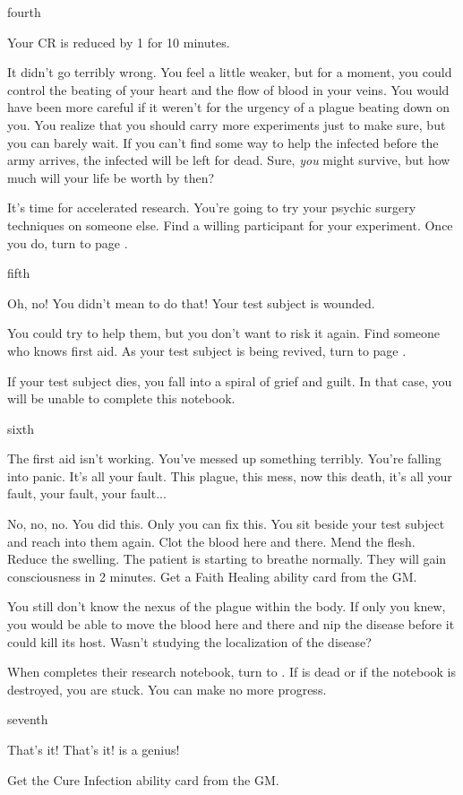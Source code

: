 \documentclass[greennotebook]{guildcamp4} %
\begin{document}
\begin{page}{fourth}

Your CR is reduced by 1 for 10 minutes.

It didn't go terribly wrong. You feel a little weaker, but for a moment, you could control the beating of your heart and the flow of blood in your veins. You would have been more careful if it weren't for the urgency of a plague beating down on you. You realize that you should carry more experiments just to make sure, but you can barely wait. If you can't find some way to help the infected before the army arrives, the infected will be left for dead. Sure, \textit{you} might survive, but how much will your life be worth by then?

It's time for accelerated research. You're going to try your psychic surgery techniques on someone else. Find a willing participant for your experiment. Once you do, turn to page .

\end{page}

\begin{page}{fifth}

Oh, no! You didn't mean to do that! Your test subject is wounded.

You could try to help them, but you don't want to risk it again. Find someone who knows first aid. As your test subject is being revived, turn to page . 

If your test subject dies, you fall into a spiral of grief and guilt. In that case, you will be unable to complete this notebook.

\end{page}

\begin{page}{sixth}

The first aid isn't working. You've messed up something terribly. You're falling into panic. It's all your fault. This plague, this mess, now this death, it's all your fault, your fault, your fault...

No, no, no. You did this. Only you can fix this. You sit beside your test subject and reach into them again. Clot the blood here and there. Mend the flesh. Reduce the swelling. The patient is starting to breathe normally. They will gain consciousness in 2 minutes. Get a Faith Healing ability card from the GM. 

You still don't know the nexus of the plague within the body. If only you knew, you would be able to move the blood here and there and nip the disease before it could kill its host. Wasn't \cOutsider{} studying the localization of the disease?

When \cOutsider{} completes their research notebook, turn to . If \cOutsider{} is dead or if the notebook is destroyed, you are stuck. You can make no more progress.

\end{page}

\begin{page}{seventh}

That's it! That's it! \cOutsider{} is a genius!

Get the Cure Infection ability card from the GM.

\end{page}

\endnotebook
\end{document}
